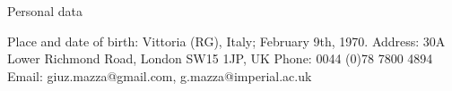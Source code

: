 \begin{rubric}{Personal data}

\entry*[2011]
Place and date of birth: Vittoria (RG), Italy; February 9th, 1970.
\entry*
Address: 30A Lower Richmond Road, London SW15 1JP, UK
\entry*
Phone: 
0044 (0)78 7800 4894       %
\entry*
Email: giuz.mazza@gmail.com, g.mazza@imperial.ac.uk
\end{rubric}
